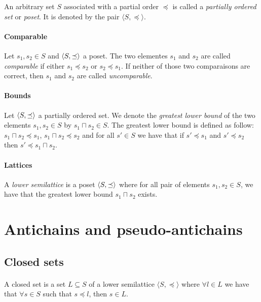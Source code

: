 \documentclass[letterpaper]{memoir}
\DeclarePairedDelimiter{\tuple}{\langle}{\rangle}
\begin{document}
An arbitrary set $S$ associated with a partial order $\preceq$
is called a \textit{partially ordered set} or \textit{poset}.
It is denoted by the pair $\langle S, \preceq \rangle$.

\paragraph{Comparable}

Let $s_1, s_2 \in S$ and $\tuple{S, \preceq}$ a poset.
The two elementes $s_1$ and $s_2$ are called \textit{comparable} if either
$s_1 \preceq s_2$ or $s_2 \preceq s_1$. If neither of those two comparaisons
are correct, then $s_1$ and $s_2$ are called \textit{uncomparable}.


\paragraph{Bounds} Let $\tuple{S, \preceq}$ a partially ordered set.
We denote the \textit{greatest lower bound} of the two elements $s_1, s_2 \in S$
by $s_1 \sqcap s_2 \in S$.
The greatest lower bound is defined as follow:
$s_1 \sqcap s_2 \preceq s_1$,
$s_1 \sqcap s_2 \preceq s_2$ and for all $s' \in S$ we have that
if $s' \preceq s_1$ and $s' \preceq s_2$ then $s' \preceq s_1 \sqcap s_2$.


\paragraph{Lattices} A \textit{lower semilattice} is a poset
$\tuple{S, \preceq}$ where for all pair of elements $s_1, s_2 \in S$,
we have that the greatest lower bound $s_1 \sqcap s_2$ exists.

\section{Antichains and pseudo-antichains}

\subsection{Closed sets}

\paragraph{}


A closed set is a set $L \subseteq S$
of a lower semilattice $\langle S, \preceq \rangle$
where $\forall l \in L$ we have that $\forall s \in S$ such that
$s \preceq l$, then $s \in L$.
\end{document}
